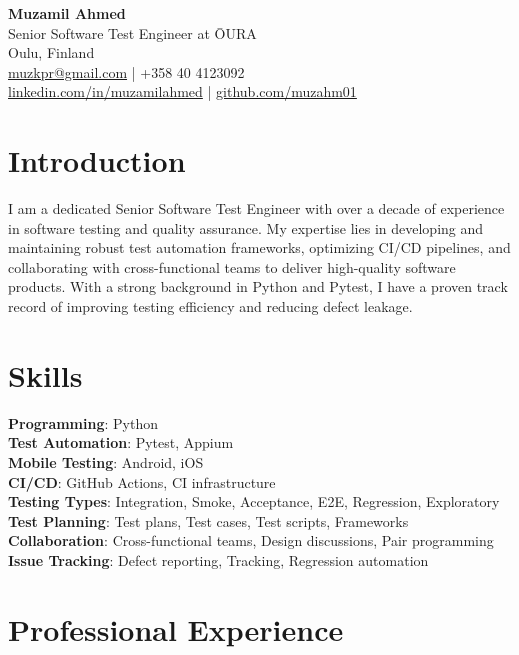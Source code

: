 \documentclass[12pt]{article}
\begin{document}
\begin{center}
    {\LARGE \textbf{Muzamil Ahmed}}\\
    Senior Software Test Engineer at ŌURA \\
    \vspace{0.1cm}
    Oulu, Finland \\
    \href{mailto:muzkpr@gmail.com}{muzkpr@gmail.com} \quad | \quad +358 40 4123092 \\
    \href{https://linkedin.com/in/muzamilahmed}{linkedin.com/in/muzamilahmed} \quad | \quad \href{https://github.com/muzahm01}{github.com/muzahm01}
    \vspace{0.2cm}
\end{center}

\section{Introduction}
I am a dedicated Senior Software Test Engineer with over a decade of experience in software testing and quality assurance. My expertise lies in developing and maintaining robust test automation frameworks, optimizing CI/CD pipelines, and collaborating with cross-functional teams to deliver high-quality software products. With a strong background in Python and Pytest, I have a proven track record of improving testing efficiency and reducing defect leakage.


\section{Skills}

\textbf{Programming}: Python \\
\textbf{Test Automation}: Pytest, Appium \\
\textbf{Mobile Testing}: Android, iOS \\
\textbf{CI/CD}: GitHub Actions, CI infrastructure \\
\textbf{Testing Types}: Integration, Smoke, Acceptance, E2E, Regression, Exploratory \\
\textbf{Test Planning}: Test plans, Test cases, Test scripts, Frameworks \\
\textbf{Collaboration}: Cross-functional teams, Design discussions, Pair programming \\
\textbf{Issue Tracking}: Defect reporting, Tracking, Regression automation

\section{Professional Experience}
\end{document}
